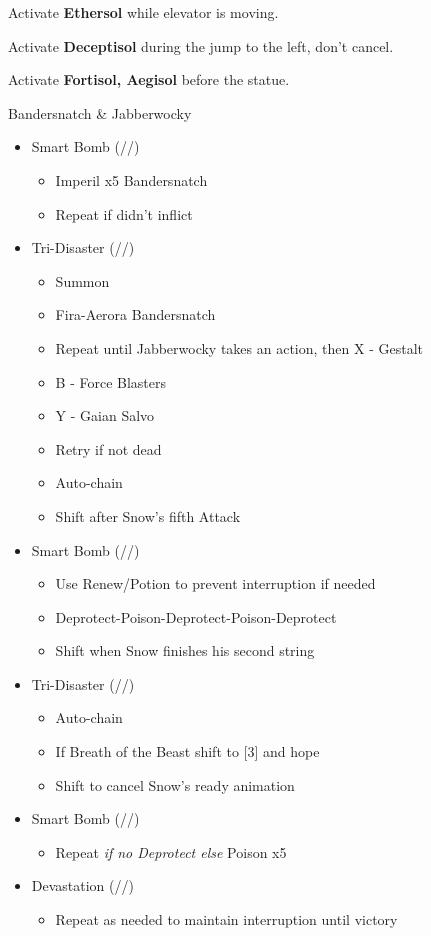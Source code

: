 \documentclass{report}
\begin{document}
Activate \textbf{Ethersol} while elevator is moving.

Activate \textbf{Deceptisol} during the jump to the left, don't cancel.

Activate \textbf{Fortisol, Aegisol} before the statue.

\renewcommand{\second}{[2] Devastation (\sab/\com/\com)}
\renewcommand{\fifth}{[5] Smart Bomb (\sab/\rav/\rav)}
\renewcommand{\sixth}{[6] Tri-Disaster (\rav/\rav/\rav)}
\begin{battle}{Bandersnatch \& Jabberwocky}
\begin{itemize}
    \item \fifth
    \begin{itemize}
        \item Imperil x5 Bandersnatch
        \item Repeat if didn't inflict
    \end{itemize}
    \item \sixth
    \begin{itemize}
        \item Summon
        \item Fira-Aerora Bandersnatch
        \item Repeat until Jabberwocky takes an action, then X - Gestalt
        \item B - Force Blasters
        \item Y - Gaian Salvo
        \item Retry if not dead
        \item Auto-chain
        \item Shift after Snow's fifth Attack
    \end{itemize}
    \item \fifth
    \begin{itemize}
        \item Use Renew/Potion to prevent interruption if needed
        \item Deprotect-Poison-Deprotect-Poison-Deprotect
        \item Shift when Snow finishes his second string
    \end{itemize}
    \item \sixth
    \begin{itemize}
        \item Auto-chain
        \item If Breath of the Beast shift to [3] and hope
        \item Shift to cancel Snow's ready animation
    \end{itemize}
    \item \fifth
    \begin{itemize}
        \item Repeat \textit{if no Deprotect else } Poison x5
    \end{itemize}
    \item \second
    \begin{itemize}
        \item Repeat as needed to maintain interruption until victory
    \end{itemize}
\end{itemize}
\end{battle}
\end{document}
